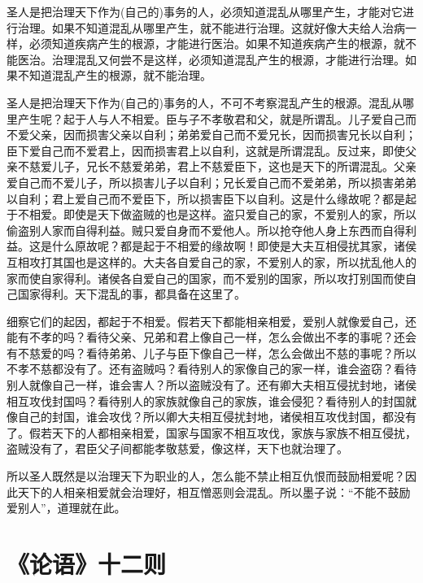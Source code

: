 \documentclass[12pt,UTF-8,openany,a4]{ctexbook}
\begin{document}
\begin{large}\yiwen
    
    圣人是把治理天下作为(自己的)事务的人，必须知道混乱从哪里产生，才能对它进行治理。如果不知道混乱从哪里产生，就不能进行治理。这就好像大夫给人治病一样，必须知道疾病产生的根源，才能进行医治。如果不知道疾病产生的根源，就不能医治。治理混乱又何尝不是这样，必须知道混乱产生的根源，才能进行治理。如果不知道混乱产生的根源，就不能治理。
    
    圣人是把治理天下作为(自己的)事务的人，不可不考察混乱产生的根源。混乱从哪里产生呢？起于人与人不相爱。臣与子不孝敬君和父，就是所谓乱。儿子爱自己而不爱父亲，因而损害父亲以自利；弟弟爱自己而不爱兄长，因而损害兄长以自利；臣下爱自己而不爱君上，因而损害君上以自利，这就是所谓混乱。反过来，即使父亲不慈爱儿子，兄长不慈爱弟弟，君上不慈爱臣下，这也是天下的所谓混乱。父亲爱自己而不爱儿子，所以损害儿子以自利；兄长爱自己而不爱弟弟，所以损害弟弟以自利；君上爱自己而不爱臣下，所以损害臣下以自利。这是什么缘故呢？都是起于不相爱。即使是天下做盗贼的也是这样。盗只爱自己的家，不爱别人的家，所以偷盗别人家而自得利益。贼只爱自身而不爱他人。所以抢夺他人身上东西而自得利益。这是什么原故呢？都是起于不相爱的缘故啊！即使是大夫互相侵扰其家，诸侯互相攻打其国也是这样的。大夫各自爱自己的家，不爱别人的家，所以扰乱他人的家而使自家得利。诸侯各自爱自己的国家，而不爱别的国家，所以攻打别国而使自己国家得利。天下混乱的事，都具备在这里了。
    
    细察它们的起因，都起于不相爱。假若天下都能相亲相爱，爱别人就像爱自己，还能有不孝的吗？看待父亲、兄弟和君上像自己一样，怎么会做出不孝的事呢？还会有不慈爱的吗？看待弟弟、儿子与臣下像自己一样，怎么会做出不慈的事呢？所以不孝不慈都没有了。还有盗贼吗？看待别人的家像自己的家一样，谁会盗窃？看待别人就像自己一样，谁会害人？所以盗贼没有了。还有卿大夫相互侵扰封地，诸侯相互攻伐封国吗？看待别人的家族就像自己的家族，谁会侵犯？看待别人的封国就像自己的封国，谁会攻伐？所以卿大夫相互侵扰封地，诸侯相互攻伐封国，都没有了。假若天下的人都相亲相爱，国家与国家不相互攻伐，家族与家族不相互侵扰，盗贼没有了，君臣父子间都能孝敬慈爱，像这样，天下也就治理了。
    
    所以圣人既然是以治理天下为职业的人，怎么能不禁止相互仇恨而鼓励相爱呢？因此天下的人相亲相爱就会治理好，相互憎恶则会混乱。所以墨子说：“不能不鼓励爱别人”，道理就在此。
    

\end{large}



\chapter{《论语》十二则}
\end{document}
